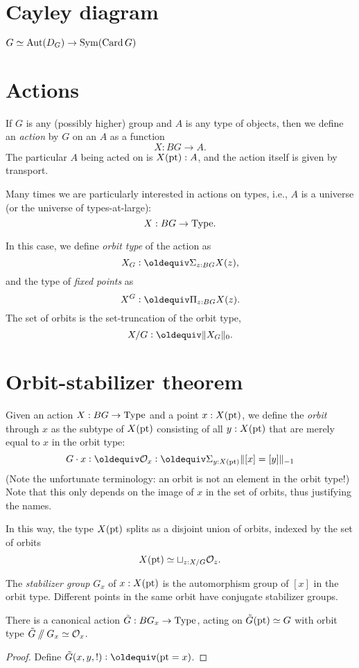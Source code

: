 \section{Cayley diagram}

$G \simeq \operatorname{Aut}(D_G) \to \operatorname{Sym}(\operatorname{Card} G)$

\section{Actions}

If $G$ is any (possibly higher) group and $A$ is any type of objects,
then we define an \emph{action} by $G$ on an $A$ as a function
\[
  X : BG \to A.
\]
The particular $A$ being acted on is $X(\mathord{\mathrm{pt}}):A$,
and the action itself is given by transport.

Many times we are particularly interested in actions on types,
i.e., $A$ is a universe (or the universe of types-at-large):
\[
  X : BG \to \mathord{\mathrm{Type}}.
\]

In this case, we define \emph{orbit type} of the action as
\[
  X_G \defeq \Sigma_{z:BG} X(z),
\]
and the type of \emph{fixed points} as
\[
  X^G \defeq \Pi_{z:BG} X(z).
\]
The set of orbits is the set-truncation of the orbit type,
\[
  X / G \defeq \Trunc{X_G}_0.
\]

\section{Orbit-stabilizer theorem}

Given an action $X : BG \to \mathord{\mathrm{Type}}$ and a point $x : X(\mathord{\mathrm{pt}})$, we define
the \emph{orbit} through $x$ as the subtype of $X(\mathord{\mathrm{pt}})$ consisting of
all $y : X(\mathord{\mathrm{pt}})$ that are merely equal to $x$ in the orbit type:
\[
  G\cdot x \defeq \mathcal O_x \defeq \Sigma_{y : X(\pt)} \merely{[x] = [y]}
\]
(Note the unfortunate terminology: an orbit is not an element in the
orbit type!)
Note that this only depends on the image of $x$ in the set of orbits,
thus justifying the names.

In this way, the type $X(\mathord{\mathrm{pt}})$ splits as a disjoint union of orbits,
indexed by the set of orbits
\[
  X(\mathord{\mathrm{pt}}) \simeq \sqcup_{z : X / G} \mathcal O_z.
\]

The \emph{stabilizer group} $G_x$ of $x : X(\mathord{\mathrm{pt}})$ is the automorphism group of $[x]$ in the orbit type.
Different points in the same orbit have conjugate stabilizer groups.

\begin{theorem}
  There is a canonical action $\tilde G : BG_x \to \mathord{\mathrm{Type}}$,
  acting on $\tilde G(\mathord{\mathrm{pt}})\simeq G$
  with orbit type $\tilde G\mathbin{/\kern-3pt/} G_x \simeq \mathcal O_x$.
\end{theorem}
\begin{proof}
  Define $\tilde G(x,y,!) \defeq (\pt = x)$.
\end{proof}

